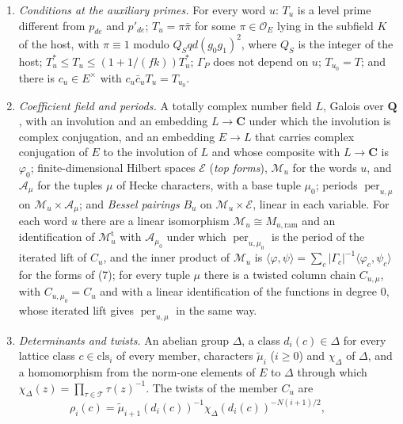 \begin{definition}
\begin{enumerate}
  $\mathcal P_u(\operatorname{ev}_u(\operatorname{col}\varphi),F)$. Put
  $M_{u,\mathrm{ram}}=M_u\cap\bigcap_v\ker\sum_{a\in\mathbf F_v^\times}\rho_v(a)$,
  $X_u=(D^*/d^*_u)^{1/(fk)}$ and $T^*_u=X_u\Gamma_P^{-2/(fk)}$.
\item \emph{Conditions at the auxiliary primes.} For every word $u$: $T_u$ is
  a level prime different from $p_{de}$ and $p'_{de}$;
  $T_u=\pi\bar\pi$ for some $\pi\in\mathcal O_E$ lying in the subfield $K$
  of the host, with $\pi\equiv1$ modulo $Q_Sqd(g_0g_1)^2$, where $Q_S$ is the
  integer of the host; $T^*_u\leq T_u\leq(1+1/(fk))T^*_u$; $\Gamma_P$ does not depend on $u$;
  $T_{u_0}=T$; and there is $c_u\in E^\times$ with $c_u\bar c_uT_u=T_{u_0}$.
\item \emph{Coefficient field and periods.} A totally complex number field
  $L$, Galois over $\mathbf Q$, with an involution and an embedding
  $L\to\mathbf C$ under which the involution is complex conjugation, and an
  embedding $E\to L$ that carries complex conjugation of $E$ to the involution
  of $L$ and whose composite with $L\to\mathbf C$ is $\varphi_0$;
  finite-dimensional Hilbert spaces
  $\mathcal E$ (\emph{top forms}), $\mathcal M_u$ for the words $u$, and
  $\mathcal A_\mu$ for the tuples $\mu$ of Hecke characters, with a base
  tuple $\mu_0$; periods $\operatorname{per}_{u,\mu}$ on
  $\mathcal M_u\times\mathcal A_\mu$; and \emph{Bessel pairings} $B_u$ on
  $\mathcal M_u\times\mathcal E$, linear in each variable. For each word $u$
  there are a linear isomorphism $\mathcal M_u\cong M_{u,\mathrm{ram}}$ and an
  identification of $\mathcal M^{\mathrm t}_u$ with $\mathcal A_{\mu_0}$ under
  which $\operatorname{per}_{u,\mu_0}$ is the period of the iterated lift of
  $C_u$, and the inner product of $\mathcal M_u$ is
  $\langle\varphi,\psi\rangle=\sum_c|\Gamma_c|^{-1}\langle\varphi_c,\psi_c\rangle$
  for the forms of (7); for every tuple $\mu$ there is a twisted
  column chain $C_{u,\mu}$, with $C_{u,\mu_0}=C_u$ and with a linear
  identification of the functions in degree $0$, whose iterated lift gives
  $\operatorname{per}_{u,\mu}$ in the same way.
\item \emph{Determinants and twists.} An abelian group $\Delta$, a class
  $d_i(c)\in\Delta$ for every lattice class $c\in\mathrm{cls}_i$ of every
  member, characters $\tilde\mu_i$ ($i\geq0$) and $\chi_\Delta$ of $\Delta$,
  and a homomorphism from the norm-one elements of $E$ to $\Delta$ through
  which $\chi_\Delta(z)=\prod_{\tau\in\mathcal T}\tau(z)^{-1}$. The twists of
  the member $C_u$ are
  \[
  \rho_i(c)=\tilde\mu_{i+1}(d_i(c))^{-1}\chi_\Delta(d_i(c))^{-N(i+1)/2},\qquad
\]
\end{enumerate}
\end{definition}

